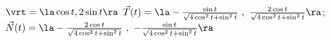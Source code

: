 {$\vrt = \la \cos t,2\sin t \ra$
}
{$\vec T(t) = \la -\frac{\sin t}{\sqrt{4\cos^2t+\sin^2t}}\ ,\ \frac{2\cos t}{\sqrt{4\cos^2t+\sin^2t}}\ra$; $\vec N(t) = \la -\frac{2\cos t}{\sqrt{4\cos^2t+\sin^2t}}\ ,\ -\frac{\sin t}{\sqrt{4\cos^2t+\sin^2t}}\ra$
}
